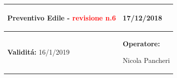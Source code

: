 \documentclass[a4paper]{article}
\begin{document}
                          \begin{center}
                          \begin{tabular}{|L{89mm} R{60mm}| }
                          \hline
                          \vspace{2.5mm}
                          \begin{spacing}{0}
                        \textbf{Preventivo Edile - } \textcolor{red}{revisione n.6}
                          \end{spacing}&
                          \vspace{2.5mm}
                          \begin{spacing}{0}

                        17/12/2018

                          \end{spacing}\\
                          \hline
                          \vspace{2.5mm}
                          \begin{spacing}{0}
                          
                        
                                \textbf{Validit\'a:}
                           16/1/2019
                          \end{spacing} &
                          \vspace{2.5mm}
                          \begin{spacing}{0}
                            \textbf{Operatore:}

                       Nicola Pancheri
                          \end{spacing} \\
                          \hline
                          \end{tabular}
                          \end{center}
                       
\end{document}
